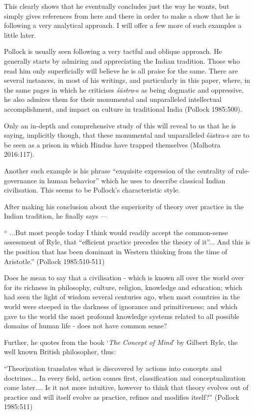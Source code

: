 This clearly shows that he eventually concludes just the way he wants, but simply gives references from here and there in order to make a show that he is following a very analytical approach. I will offer a few more of such examples a little later.

Pollock is usually seen following a very tactful and oblique approach. He generally starts by admiring and appreciating the Indian tradition. Those who read him only superficially will believe he is all praise for the same. There are several instances, in most of his writings, and particularly in this paper, where, in the same pages in which he criticises {\it śāstra}-s as being dogmatic and oppressive, he also admires them for their monumental and unparalleled intellectual accomplishment, and impact on culture in traditional India (Pollock 1985:500). 

Only an in-depth and comprehensive study of this will reveal to us that he is saying, implicitly though, that these monumental and unparalleled śāstra-s are to be seen as a prison in which Hindus have trapped themselves (Malhotra 2016:117).

Another such example is his phrase ``exquisite expression of the centrality of rule-governance in human behavior'' which he uses to describe classical Indian civilisation. This seems to be Pollock's characteristic style. 

After making his conclusion about the superiority of theory over practice in the Indian tradition, he finally says ---
\begin{myquote}
`` ...But most people today I think would readily accept the common-sense assessment of Ryle, that ``efficient practice precedes the theory of it''... And this is the position that has been dominant in Western thinking from the time of Aristotle.''  \hfill (Pollock 1985:510-511)
\end{myquote}

Does he mean to say that a civilisation - which is known all over the world over for its richness in philosophy, culture, religion, knowledge and education; which had seen the light of wisdom several centuries ago, when most countries in the world were steeped in the darkness of ignorance and primitiveness; and which gave to the world the most profound knowledge systems related to all possible domains of human life - does not have common sense?

Further, he quotes from the book `\textsl{The Concept of Mind}' by Gilbert Ryle, the well known British philosopher, thus: 
\begin{myquote}
``Theorization translates what is discovered by actions into concepts and doctrines... In every field, action comes first, classification and conceptualization come later.... Is it not more intuitive, however to think that theory evolves out of practice and will itself evolve as practice, refines and modifies itself?'' 
\hfill (Pollock 1985:511)
\end{myquote}

